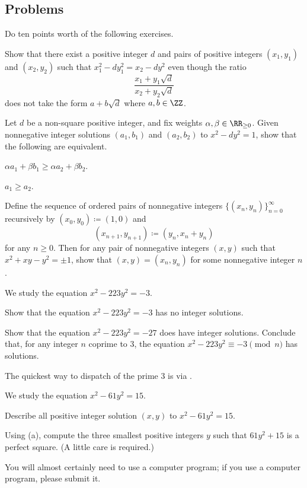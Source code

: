 \documentclass[../notes.tex]{subfiles}
\begin{document}
\subsection{Problems}
Do ten points worth of the following exercises.
\begin{prob}[2 points] \label{prob:norm-equal-not-unit-ratio}
	Show that there exist a positive integer $d$ and pairs of positive integers $(x_1,y_1)$ and $(x_2,y_2)$ such that $x_1^2-dy_1^2=x_2-dy^2$ even though the ratio
	\[\frac{x_1+y_1\sqrt d}{x_2+y_2\sqrt d}\]
	does not take the form $a+b\sqrt d$ where $a,b\in\ZZ$.
\end{prob}
\begin{prob}[2 points] \label{prob:fund-unit-is-really-smallest}
	Let $d$ be a non-square positive integer, and fix weights $\alpha,\beta\in\RR_{\ge0}$. Given nonnegative integer solutions $(a_1,b_1)$ and $(a_2,b_2)$ to $x^2-dy^2=1$, show that the following are equivalent.
	\begin{listalph}
		\item $\alpha a_1+\beta b_1\ge\alpha a_2+\beta b_2$.
		\item $a_1\ge a_2$.
	\end{listalph}
\end{prob}
\begin{prob}[4 points] \label{prob:pell-5-norm}
	Define the sequence of ordered pairs of nonnegative integers $\{(x_n,y_n)\}_{n=0}^\infty$ recursively by $(x_0,y_0)\coloneqq(1,0)$ and
	\[(x_{n+1},y_{n+1})\coloneqq(y_n,x_n+y_n)\]
	for any $n\ge0$. Then for any pair of nonnegative integers $(x,y)$ such that $x^2+xy-y^2=\pm1$, show that $(x,y)=(x_n,y_n)$ for some nonnegative integer $n$.
\end{prob}
\begin{prob}[4 points] \label{prob:norm-223}
	We study the equation $x^2-223y^2=-3$.
	\begin{listalph}
		\item Show that the equation $x^2-223y^2=-3$ has no integer solutions.
		\item Show that the equation $x^2-223y^2=-27$ does have integer solutions. Conclude that, for any integer $n$ coprime to $3$, the equation $x^2-223y^2\equiv-3\pmod n$  has solutions.
	\end{listalph}
	The quickest way to dispatch of the prime $3$ is via .
\end{prob}
\begin{prob}[5 points]
	We study the equation $x^2-61y^2=15$.
	\begin{listalph}
		\item Describe all positive integer solution $(x,y)$ to $x^2-61y^2=15$.
		\item Using (a), compute the three smallest positive integers $y$ such that $61y^2+15$ is a perfect square. (A little care is required.)
	\end{listalph}
	You will almost certainly need to use a computer program; if you use a computer program, please submit it.
\end{prob}
\end{document}
